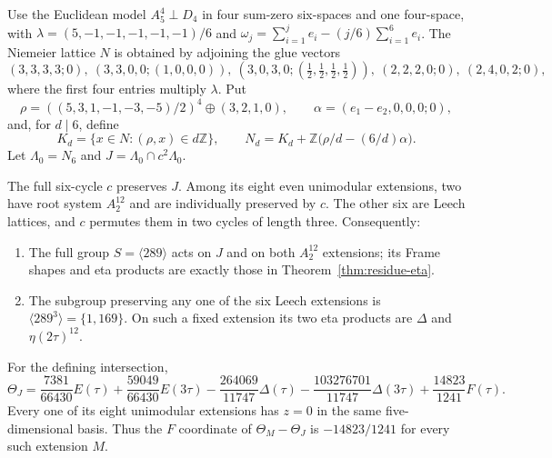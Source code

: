 Use the Euclidean model $A_5^4\perp D_4$ in four sum-zero six-spaces
and one four-space, with
$\lambda=(5,-1,-1,-1,-1,-1)/6$ and
$\omega_j=\sum_{i=1}^j e_i-(j/6)\sum_{i=1}^6e_i$.
The Niemeier lattice $N$ is obtained by adjoining the glue vectors
\[
 (3,3,3,3;0),\ (3,3,0,0;(1,0,0,0)),\
 (3,0,3,0;(\tfrac12,\tfrac12,\tfrac12,\tfrac12)),\
 (2,2,2,0;0),\ (2,4,0,2;0),
\]
where the first four entries multiply $\lambda$. Put
\[
 \rho=((5,3,1,-1,-3,-5)/2)^4\oplus(3,2,1,0),\qquad
 \alpha=(e_1-e_2,0,0,0;0),
\]
and, for $d\mid6$, define
\[
 K_d=\{x\in N:(\rho,x)\in d\mathbb Z\},\qquad
 N_d=K_d+\mathbb Z\bigl(\rho/d-(6/d)\alpha\bigr).
\]
Let $\Lambda_0=N_6$ and $J=\Lambda_0\cap c^2\Lambda_0$.

\begin{theorem}\label{thm:residue-stability}
The full six-cycle $c$ preserves $J$. Among its eight even unimodular
extensions, two have root system $A_2^{12}$ and are individually
preserved by $c$. The other six are Leech lattices, and $c$ permutes
them in two cycles of length three. Consequently:
\begin{enumerate}
\item The full group $S=\langle289\rangle$ acts on $J$ and on both
$A_2^{12}$ extensions; its Frame shapes and eta products are exactly
those in Theorem~\ref{thm:residue-eta}.
\item The subgroup preserving any one of the six Leech extensions
is $\langle289^3\rangle=\{1,169\}$. On such a fixed extension its
two eta products are $\Delta$ and $\eta(2\tau)^{12}$.
\end{enumerate}
For the defining intersection,
\begin{equation}\label{eq:theta-J-exact}
 \Theta_J=\frac{7381}{66430}E(\tau)
 +\frac{59049}{66430}E(3\tau)
 -\frac{264069}{11747}\Delta(\tau)
 -\frac{103276701}{11747}\Delta(3\tau)
 +\frac{14823}{1241}F(\tau).
\end{equation}
Every one of its eight unimodular extensions has $z=0$ in the same
five-dimensional basis. Thus the $F$ coordinate of
$\Theta_M-\Theta_J$ is $-14823/1241$ for every such extension $M$.
\end{theorem}

